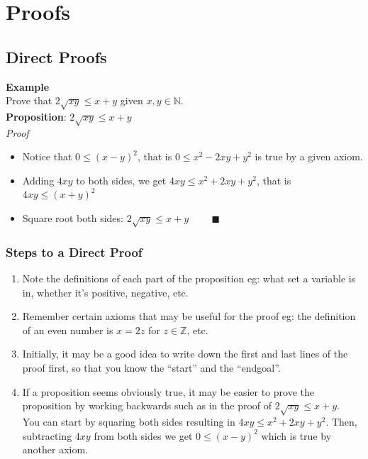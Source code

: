 \documentclass[a4paper,11pt]{article}
\begin{document}
\section{Proofs}
\subsection{Direct Proofs}
\textbf{Example}\\
Prove that $2\sqrt{xy} \leq x + y$ given $x,y \in \mathbb{N}$.\vspace{5pt}\\
\textbf{Proposition}: $2\sqrt{xy} \leq x + y$\vspace{5pt}\\
\textit{Proof}
\begin{itemize}
  \item Notice that $0 \leq (x - y)^2$, that is $0 \leq x^2-2xy+y^2$ is true by a given axiom.
  \item Adding $4xy$ to both sides, we get $4xy \leq x^2+2xy+y^2$, that is $4xy \leq (x+y)^2$
  \item Square root both sides: $2\sqrt{xy} \leq x+y$ $~~~~~~~~~\blacksquare$
\end{itemize}
\subsubsection{Steps to a Direct Proof}
\begin{enumerate}
 \item Note the definitions of each part of the proposition eg: what set a variable is in, whether it's positive, negative, etc.

 \item Remember certain axioms that may be useful for the proof eg: the definition of an even number is $x=2z$ for $z \in \mathbb{Z}$, etc.

 \item Initially, it may be a good idea to write down the first and last lines of the proof first, so that you know the ``start'' and the ``endgoal''.

 \item If a proposition seems obviously true, it may be easier to prove the proposition by working backwards such as in the proof of $2\sqrt{xy} \leq x+y$.\vspace{5pt}\\
 You can start by squaring both sides resulting in $4xy \leq x^2 + 2xy + y^2$. Then, subtracting $4xy$ from both sides we get $0 \leq (x-y)^2$ which is true by another axiom.
\end{enumerate}
\end{document}
